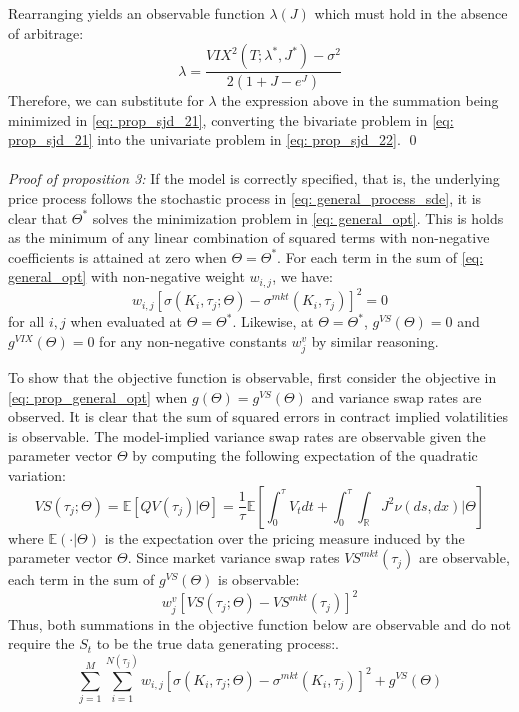 \documentclass[12pt]{article}
\begin{document}
Rearranging yields an observable function $\lambda(J)$ which must hold in the absence of arbitrage:
$$\lambda =\dfrac{ VIX^2(T; \lambda^*, J^*)  - \sigma^2}{2(1+J - e^{J})} $$
Therefore, we can substitute for $\lambda$ the expression above in the summation being minimized in \eqref{eq: prop_sjd_21}, converting the bivariate problem in \eqref{eq: prop_sjd_21} into the univariate problem in \eqref{eq: prop_sjd_22}.
\qed \\ 
\\
\textit{Proof of proposition 3: } If the model is correctly specified, that is, the underlying price process follows the stochastic process in \eqref{eq: general_process_sde}, it is clear that $\Theta^*$ solves the minimization problem in \eqref{eq: general_opt}. This is holds as the minimum of any linear combination of squared terms with non-negative coefficients is attained at zero when $\Theta = \Theta^*$. For each term in the sum of \eqref{eq: general_opt} with non-negative weight $w_{i,j}$, we have:
$$w_{i,j}\left[\sigma(K_i, \tau_j; \Theta) - \sigma^{mkt}(K_i, \tau_j)\right]^2  = 0$$
for all $i,j$ when evaluated at $\Theta = \Theta^*$. Likewise, at $\Theta = \Theta^*$, $g^{VS}(\Theta) = 0$ and $g^{VIX}(\Theta) = 0$ for any non-negative constants $w^v_j$ by similar reasoning.

To show that the objective function is observable, first consider the objective in \eqref{eq: prop_general_opt} when $g(\Theta) = g^{VS}(\Theta)$ and variance swap rates are observed. It is clear that the sum of squared errors in contract implied volatilities is observable. The model-implied variance swap rates are observable given the parameter vector $\Theta$ by computing the following expectation of the quadratic variation:
$$VS(\tau_j; \Theta) = \mathbb{E}\left[QV(\tau_j) \vert \Theta\right] = \dfrac{1}{\tau} \mathbb{E}\left[\int_0^{\tau} V_t  d t + \int_0^{\tau} \int_{\mathbb{R}} J^2 \nu(d s, d x)\Big\vert \Theta\right ]$$
where $\mathbb{E}\left(\cdot\vert \Theta\right)$ is the expectation over the pricing measure induced by the parameter vector $\Theta$. Since market variance swap rates $VS^{mkt}(\tau_j)$ are observable, each term in the sum of $g^{VS}(\Theta)$ is observable:
$$w_j^v \left[VS(\tau_j;  \Theta) - VS^{mkt}(\tau_j)\right]^2 $$
Thus, both summations in the objective function below are observable and do not require the $S_t$ to be the true data generating process:.
$$\sum\limits_{j=1}^{M}\sum\limits_{i=1}^{N(\tau_j)} w_{i,j}\left[\sigma(K_i, \tau_j; \Theta) - \sigma^{mkt}(K_i, \tau_j)\right]^2 +  g^{VS}(\Theta) $$
\end{document}

